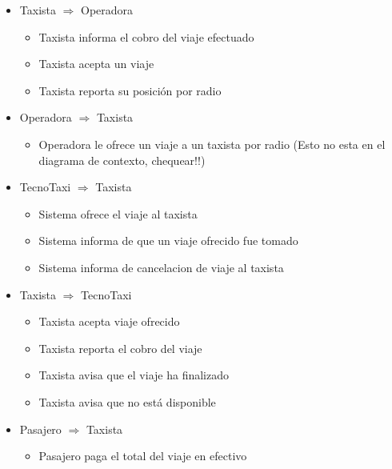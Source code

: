 \begin{itemize}
\begin{itemize}
        \end{itemize}

        \item Taxista $\Rightarrow$ Operadora
  	 	 \begin{itemize}
        \item Taxista informa el cobro del viaje efectuado
        \item Taxista acepta un viaje
        \item Taxista reporta su posici\'on por radio
        
        \end{itemize}

         \item Operadora $\Rightarrow$ Taxista
       \begin{itemize}
        \item Operadora le ofrece un viaje a un taxista por radio (Esto no esta en el diagrama de contexto, chequear!!)
        
        \end{itemize}


    \item TecnoTaxi $\Rightarrow$ Taxista
    \begin{itemize}
        \item Sistema ofrece el viaje al taxista
        \item Sistema informa de que un viaje ofrecido fue tomado
        \item Sistema informa de cancelacion de viaje al taxista
    \end{itemize}

    \item Taxista $\Rightarrow$ TecnoTaxi
    \begin{itemize}
         \item Taxista acepta viaje ofrecido
         \item Taxista reporta el cobro del viaje
         \item Taxista avisa que el viaje ha finalizado
         \item Taxista avisa que no est\'a disponible
         \end{itemize}

         \item Pasajero $\Rightarrow$ Taxista
    \begin{itemize}
         \item Pasajero paga el total del viaje en efectivo
    \end{itemize}


\end{itemize}
